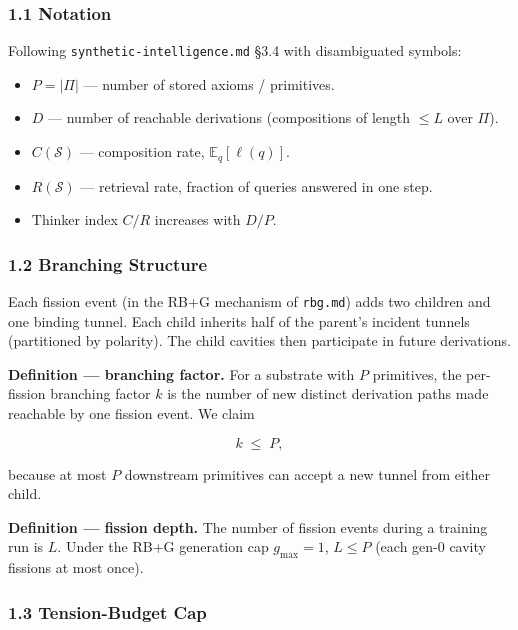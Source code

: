 \documentclass[
  11pt,
  a4paper,
]{article}
\providecommand{\tightlist}{%
  \setlength{\itemsep}{0pt}\setlength{\parskip}{0pt}}
\begin{document}
\subsubsection{1.1 Notation}\label{notation}

Following \texttt{synthetic-intelligence.md} §3.4 with disambiguated
symbols:

\begin{itemize}
\tightlist
\item
  \(P = |\Pi|\) --- number of stored axioms / primitives.
\item
  \(D\) --- number of reachable derivations (compositions of length
  \(\leq L\) over \(\Pi\)).
\item
  \(C(\mathcal{S})\) --- composition rate, \(\mathbb{E}_q[\ell(q)]\).
\item
  \(R(\mathcal{S})\) --- retrieval rate, fraction of queries answered in
  one step.
\item
  Thinker index \(C/R\) increases with \(D/P\).
\end{itemize}

\subsubsection{1.2 Branching Structure}\label{branching-structure}

Each fission event (in the RB+G mechanism of \texttt{rbg.md}) adds two
children and one binding tunnel. Each child inherits half of the
parent's incident tunnels (partitioned by polarity). The child cavities
then participate in future derivations.

\textbf{Definition --- branching factor.} For a substrate with \(P\)
primitives, the per-fission branching factor \(k\) is the number of new
distinct derivation paths made reachable by one fission event. We claim

\[
k \;\leq\; P,
\]

because at most \(P\) downstream primitives can accept a new tunnel from
either child.

\textbf{Definition --- fission depth.} The number of fission events
during a training run is \(L\). Under the RB+G generation cap
\(g_\text{max} = 1\), \(L \leq P\) (each gen-0 cavity fissions at most
once).

\subsubsection{1.3 Tension-Budget Cap}\label{tension-budget-cap}
\end{document}

